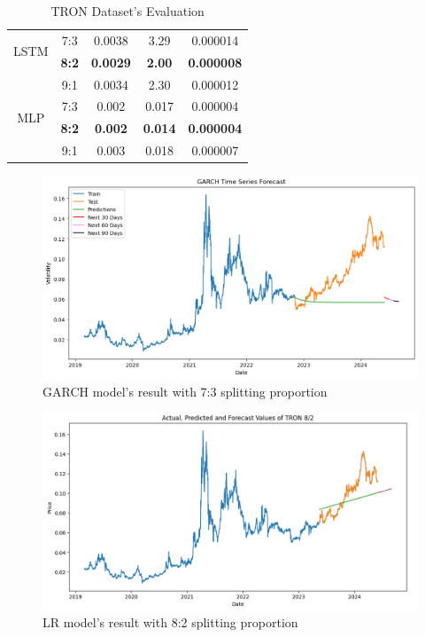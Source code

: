 \documentclass{ieeeojies}
\begin{document}
\begin{table}[H]
\begin{tabular}{|c|c|c|c|c|}
    \hline
    \multirow{2}{*}{LSTM}  & 7:3              & 0.0038         & 3.29           & 0.000014       \\ & \textbf{8:2} & \textbf{0.0029} & \textbf{2.00} &  \textbf{0.000008} \\ & 9:1 &  0.0034 &	2.30 & 0.000012 \\
    \hline
    \multirow{2}{*}{MLP}   & 7:3              & 0.002          & 0.017          & 0.000004       \\ & \textbf{8:2} & \textbf{0.002} & \textbf{0.014} &  \textbf{0.000004} \\ & 9:1 & 0.003 & 0.018 & 0.000007\\
    \hline
  \end{tabular}
  \caption{TRON Dataset's Evaluation}
  \label{tronresult}
\end{table}
\vspace{-10mm}
\begin{figure}[H]
  \centering
  \begin{minipage}{0.8\linewidth}
    \centering
    \includegraphics[width=\linewidth]{Image/Garch/GARCH_TRON73.png}
    \caption{GARCH model's result with 7:3 splitting proportion}
    \label{fig:7}
  \end{minipage}
\end{figure}
\vspace{-5mm}
\begin{figure}[H]
  \centering
  \begin{minipage}{0.8\linewidth}
    \centering
    \includegraphics[width=\linewidth]{Image/LN/LN_TRON_82.png}
    \caption{LR model's result with 8:2 splitting proportion}
    \label{fig:8}
  \end{minipage}
\end{figure}
\end{document}
